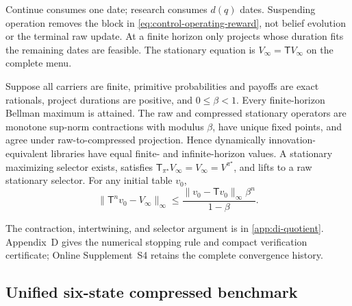 Continue consumes one date; research consumes \(d(q)\) dates.  Suspending
operation removes the block in \eqref{eq:control-operating-reward}, not belief
evolution or the terminal raw update.  At a finite horizon only projects whose
duration fits the remaining dates are feasible.  The stationary equation is
\(V_\infty=\mathsf TV_\infty\) on the complete menu.

\begin{proposition}
\label{prop:finite-horizon-action-attainment}
\label{thm:finite-state-contraction}
Suppose all carriers are finite, primitive probabilities and payoffs are exact
rationals, project durations are positive, and \(0\le\beta<1\).  Every
finite-horizon Bellman maximum is attained.  The raw and compressed stationary
operators are monotone sup-norm contractions with modulus \(\beta\), have
unique fixed points, and agree under raw-to-compressed projection.  Hence
dynamically innovation-equivalent libraries have equal finite- and
infinite-horizon values.  A stationary maximizing selector exists, satisfies
\(\mathsf T_{\pi^\star}V_\infty=V_\infty=V^{\pi^\star}\), and lifts to a raw
stationary selector.  For any initial table \(v_0\),
\begin{equation}\label{eq:control-geometric-bound}
 \lVert\mathsf T^n v_0-V_\infty\rVert_\infty
 \le \frac{\lVert v_0-\mathsf T v_0\rVert_\infty\beta^n}{1-\beta}.
\end{equation}
\end{proposition}

The contraction, intertwining, and selector argument is in
\cref{app:di-quotient}.  Appendix~D gives the numerical stopping rule and
compact verification certificate; Online Supplement~S4 retains the complete
convergence history.

\subsection{Unified six-state compressed benchmark}
\label{sec:numerics}

